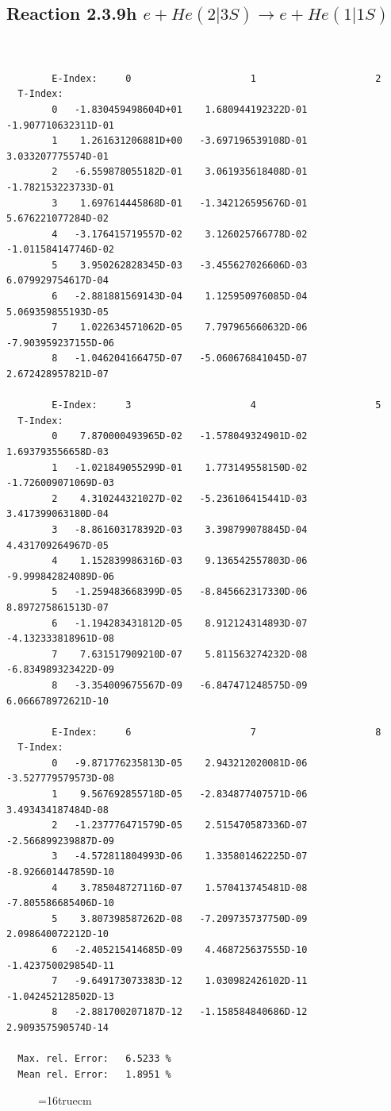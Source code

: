 \documentclass[12pt,dvips]{article}
\begin{document}
\subsection{
Reaction 2.3.9h  $e + He(2|3S) \rightarrow e + He(1|1S) $
}


\begin{small}\begin{verbatim}


        E-Index:     0                     1                     2
  T-Index:
        0   -1.830459498604D+01    1.680944192322D-01   -1.907710632311D-01
        1    1.261631206881D+00   -3.697196539108D-01    3.033207775574D-01
        2   -6.559878055182D-01    3.061935618408D-01   -1.782153223733D-01
        3    1.697614445868D-01   -1.342126595676D-01    5.676221077284D-02
        4   -3.176415719557D-02    3.126025766778D-02   -1.011584147746D-02
        5    3.950262828345D-03   -3.455627026606D-03    6.079929754617D-04
        6   -2.881881569143D-04    1.125950976085D-04    5.069359855193D-05
        7    1.022634571062D-05    7.797965660632D-06   -7.903959237155D-06
        8   -1.046204166475D-07   -5.060676841045D-07    2.672428957821D-07

        E-Index:     3                     4                     5
  T-Index:
        0    7.870000493965D-02   -1.578049324901D-02    1.693793556658D-03
        1   -1.021849055299D-01    1.773149558150D-02   -1.726009071069D-03
        2    4.310244321027D-02   -5.236106415441D-03    3.417399063180D-04
        3   -8.861603178392D-03    3.398799078845D-04    4.431709264967D-05
        4    1.152839986316D-03    9.136542557803D-06   -9.999842824089D-06
        5   -1.259483668399D-05   -8.845662317330D-06    8.897275861513D-07
        6   -1.194283431812D-05    8.912124314893D-07   -4.132333818961D-08
        7    7.631517909210D-07    5.811563274232D-08   -6.834989323422D-09
        8   -3.354009675567D-09   -6.847471248575D-09    6.066678972621D-10

        E-Index:     6                     7                     8
  T-Index:
        0   -9.871776235813D-05    2.943212020081D-06   -3.527779579573D-08
        1    9.567692855718D-05   -2.834877407571D-06    3.493434187484D-08
        2   -1.237776471579D-05    2.515470587336D-07   -2.566899239887D-09
        3   -4.572811804993D-06    1.335801462225D-07   -8.926601447859D-10
        4    3.785048727116D-07    1.570413745481D-08   -7.805586685406D-10
        5    3.807398587262D-08   -7.209735737750D-09    2.098640072212D-10
        6   -2.405215414685D-09    4.468725637555D-10   -1.423750029854D-11
        7   -9.649173073383D-12    1.030982426102D-11   -1.042452128502D-13
        8   -2.881700207187D-12   -1.158584840686D-12    2.909357590574D-14

  Max. rel. Error:   6.5233 %
  Mean rel. Error:   1.8951 %

\end{verbatim}\end{small}
\begin{figure} \label{2.3.9h}
\epsfxsize=16truecm
\end{figure}
\newpage
\end{document}
